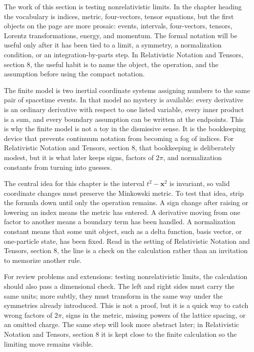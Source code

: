 The work of this section is testing nonrelativistic limits.  In the chapter heading the vocabulary is indices, metric, four-vectors, tensor equations, but the first objects on the page are more prosaic: events, intervals, four-vectors, tensors, Lorentz transformations, energy, and momentum.  The formal notation will be useful only after it has been tied to a limit, a symmetry, a normalization condition, or an integration-by-parts step.  In Relativistic Notation and Tensors, section 8, the useful habit is to name the object, the operation, and the assumption before using the compact notation.

The finite model is two inertial coordinate systems assigning numbers to the same pair of spacetime events.  In that model no mystery is available: every derivative is an ordinary derivative with respect to one listed variable, every inner product is a sum, and every boundary assumption can be written at the endpoints.  This is why the finite model is not a toy in the dismissive sense.  It is the bookkeeping device that prevents continuum notation from becoming a fog of indices.  For Relativistic Notation and Tensors, section 8, that bookkeeping is deliberately modest, but it is what later keeps signs, factors of \(2\pi\), and normalization constants from turning into guesses.

The central idea for this chapter is the interval \(t^2-\bm x^2\) is invariant, so valid coordinate changes must preserve the Minkowski metric.  To test that idea, strip the formula down until only the operation remains.  A sign change after raising or lowering an index means the metric has entered.  A derivative moving from one factor to another means a boundary term has been handled.  A normalization constant means that some unit object, such as a delta function, basis vector, or one-particle state, has been fixed.  Read in the setting of Relativistic Notation and Tensors, section 8, the line is a check on the calculation rather than an invitation to memorize another rule.

For review problems and extensions: testing nonrelativistic limits, the calculation should also pass a dimensional check.  The left and right sides must carry the same units; more subtly, they must transform in the same way under the symmetries already introduced.  This is not a proof, but it is a quick way to catch wrong factors of \(2\pi\), signs in the metric, missing powers of the lattice spacing, or an omitted charge.  The same step will look more abstract later; in Relativistic Notation and Tensors, section 8 it is kept close to the finite calculation so the limiting move remains visible.

